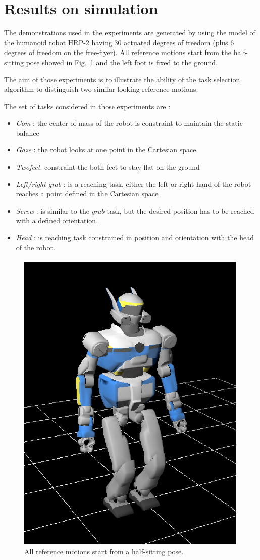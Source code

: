 \documentclass[letterpaper, 10pt, conference]{ieeeconf}      %
\begin{document}
\section{Results on simulation}
The demonstrations used in the experiments are generated by using the model
of the humanoid robot HRP-2 having 30 actuated degrees of freedom (plus 6 degrees of freedom on the
free-flyer). All reference motions start from the half-sitting pose showed in Fig.~\ref{fig:halfSit} and
the left foot is fixed to the ground.

The aim of those experiments is to illustrate the ability of the
task selection algorithm to distinguish two similar looking reference motions.

The set of tasks considered in those experiments are :

\begin{itemize}
  \item \emph{Com} : the center of mass of the robot is constraint to maintain the static balance
  \item \emph{Gaze} : the robot looks at one point in the Cartesian space
  \item \emph{Twofeet}: constraint the both feet to stay flat on the ground
  \item \emph{Left/right grab} : is a reaching task, either the left or right hand
of the robot reaches a point defined in the Cartesian space
  \item \emph{Screw} : is similar to the \emph{grab} task, but the desired position
has to be reached with a defined orientation.
  \item \emph{Head} : is reaching task constrained in position and orientation with the head of the
    robot.
\end{itemize}
\begin{figure}[t]
\begin{center}
\includegraphics[width=0.3\linewidth]{img/halfSit.ps}
\end{center}
\caption{All reference motions start from a half-sitting pose.}
\label{fig:halfSit}
\end{figure}
\end{document}
